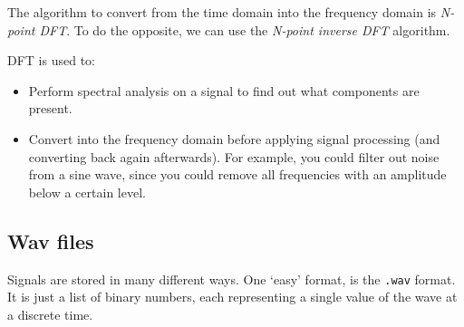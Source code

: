 The algorithm to convert from the time domain into the frequency domain is
\textit{N-point DFT}. To do the opposite, we can use the \textit{N-point inverse
DFT} algorithm.

DFT is used to:

\begin{itemize}
  \item Perform spectral analysis on a signal to find out what components are 
    present.
  \item Convert into the frequency domain before applying signal processing (and
    converting back again afterwards). For example, you could filter out noise 
    from a sine wave, since you could remove all frequencies with an amplitude
    below a certain level.
\end{itemize}

\subsection{Wav files}

Signals are stored in many different ways. One `easy' format, is the
\texttt{.wav} format. It is just a list of binary numbers, each representing a
single value of the wave at a discrete time.

